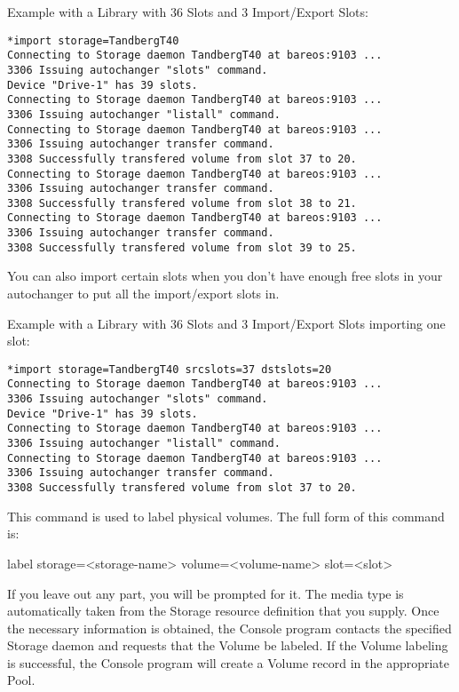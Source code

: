 \begin{description}
{   Example with a Library with 36 Slots and 3 Import/Export Slots:

\footnotesize
\begin{verbatim}
*import storage=TandbergT40
Connecting to Storage daemon TandbergT40 at bareos:9103 ...
3306 Issuing autochanger "slots" command.
Device "Drive-1" has 39 slots.
Connecting to Storage daemon TandbergT40 at bareos:9103 ...
3306 Issuing autochanger "listall" command.
Connecting to Storage daemon TandbergT40 at bareos:9103 ...
3306 Issuing autochanger transfer command.
3308 Successfully transfered volume from slot 37 to 20.
Connecting to Storage daemon TandbergT40 at bareos:9103 ...
3306 Issuing autochanger transfer command.
3308 Successfully transfered volume from slot 38 to 21.
Connecting to Storage daemon TandbergT40 at bareos:9103 ...
3306 Issuing autochanger transfer command.
3308 Successfully transfered volume from slot 39 to 25.
\end{verbatim}
\normalsize

   You can also import certain slots when you don't have enough free slots
   in your autochanger to put all the import/export slots in.

   Example with a Library with 36 Slots and 3 Import/Export Slots importing one slot:

\footnotesize
\begin{verbatim}
*import storage=TandbergT40 srcslots=37 dstslots=20
Connecting to Storage daemon TandbergT40 at bareos:9103 ...
3306 Issuing autochanger "slots" command.
Device "Drive-1" has 39 slots.
Connecting to Storage daemon TandbergT40 at bareos:9103 ...
3306 Issuing autochanger "listall" command.
Connecting to Storage daemon TandbergT40 at bareos:9103 ...
3306 Issuing autochanger transfer command.
3308 Successfully transfered volume from slot 37 to 20.
\end{verbatim}
\normalsize

\item [label]
   This command is used to label physical volumes.
   The full form of this command is:

label storage={\textless}storage-name{\textgreater} volume={\textless}volume-name{\textgreater}
  slot={\textless}slot{\textgreater}

   If you leave out any part, you will be prompted for it.  The media type
   is automatically taken from the Storage resource definition that you
   supply.  Once the necessary information is obtained, the Console program
   contacts the specified Storage daemon and requests that the Volume be
   labeled.  If the Volume labeling is successful, the Console program will
   create a Volume record in the appropriate Pool.

}
\end{description}
